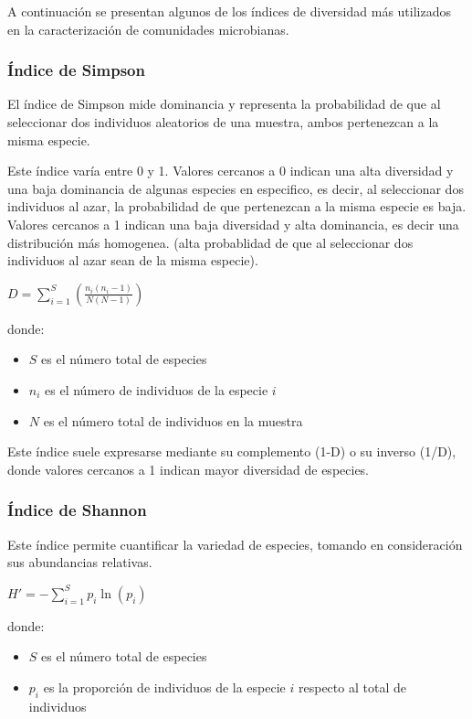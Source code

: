A continuación se presentan algunos de los índices de diversidad más utilizados en la caracterización de comunidades microbianas.   


\subsubsection{Índice de Simpson}
El índice de Simpson mide dominancia y representa la probabilidad de que al seleccionar dos individuos aleatorios de una muestra, ambos pertenezcan a la misma especie. 

Este índice varía entre 0 y 1.  
Valores cercanos a 0 indican una alta diversidad y una baja dominancia de algunas especies en especifico, es decir, al seleccionar dos individuos al azar, la probabilidad de que pertenezcan a la misma especie es baja. 
Valores cercanos a 1 indican una baja diversidad y alta dominancia, es decir una distribución más homogenea. (alta probablidad de que al seleccionar dos individuos al azar sean de la misma especie).
\begin{center}
\begin{math}
D = \sum_{i=1}^{S} \left( \frac{n_i (n_i - 1)}{N (N - 1)} \right)
\end{math}
\end{center}

donde: 
\begin{itemize}
    \item $S$ es el número total de especies
    \item $n_i$ es el número de individuos de la especie $i$
    \item $N$ es el número total de individuos en la muestra
\end{itemize}
Este índice suele expresarse mediante su complemento (1-D) o su inverso (1/D), donde valores cercanos a 1 indican mayor diversidad de especies.

\subsubsection{Índice de Shannon}
Este índice permite cuantificar la variedad de especies, tomando en consideración sus abundancias relativas.

\begin{center}
    \begin{math}
H' = - \sum_{i=1}^{S} p_i \ln(p_i)
\end{math}
\end{center}
donde:
\begin{itemize}
    \item $S$ es el número total de especies
    \item $p_i$ es la proporción de individuos de la especie $i$ respecto al total de individuos
\end{itemize}


